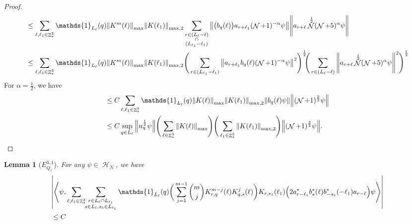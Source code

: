 \documentclass[sn-mathphys, Numbered ,a4paper]{sn-jnl}%
\DeclareMathOperator{\Z}{\mathbb{Z}}
\DeclareMathOperator{\HH}{\mathcal{H}}
\DeclareMathOperator{\NN}{\mathcal{N}}
\newcommand{\half}{\frac{1}{2}}
\newcommand{\eva}[1]{\left\langle #1 \right\rangle}
\theoremstyle{plain}
\newtheorem{lemma}[theorem]{Lemma}
\theoremstyle{definition}
\theoremstyle{remark}
\theoremstyle{plain}
\theoremstyle{definition}
\theoremstyle{remark}
\begin{document}
\begin{proof}
\begin{align}
		&\leq \sum\limits_{\ell,\ell_1 \in \Z^3_*} \mathds{1}_{L_\ell}(q) \norm{K^{m}(\ell)}_{\mathrm{max}}\norm{K(\ell_1)}_{\mathrm{max},2} \sum\limits_{\substack{r \in (L_\ell-\ell) \\ \cap \\ (L_{\ell_1}-\ell_1)}} \norm{\big(b_{q}(\ell)\big) a_{r+\ell_1} (\NN+1)^{-\alpha} \psi} \norm { a_{r+\ell}\NN^\half (\NN+5)^{\alpha} \psi }\nonumber\\
		&\leq \sum\limits_{\ell,\ell_1 \in \Z^3_*} \mathds{1}_{L_\ell}(q) \norm{K^{m}(\ell)}_{\mathrm{max}}\norm{K(\ell_1)}_{\mathrm{max},2} \Bigg(\sum\limits_{r \in (L_{\ell_1}-\ell_1)} \norm{ a_{r+\ell_1}b_{q}(\ell) (\NN+1)^{-\alpha} \psi}^2\Bigg)^\half\!\!\Bigg( \sum\limits_{r \in (L_\ell-\ell)} \norm { a_{r+\ell}\NN^\half (\NN+5)^{\alpha} \psi }^2\Bigg)^\half\nonumber\\
	\end{align}
	For $\alpha = \half$, we have
	\begin{align}
		&\leq C\sum\limits_{\ell,\ell_1 \in \Z^3_*} \mathds{1}_{L_\ell}(q) \norm{K(\ell)}_{\mathrm{max}}\norm{K(\ell_1)}_{\mathrm{max},2}  \norm{b_{q}(\ell) \psi} \norm { (\NN+1)^{\frac{3}{2}} \psi }\nonumber\\
		&\leq C \sup\limits_{q \in L_\ell} \norm{n_{q}^{\half} \psi} \Bigg(\sum\limits_{\ell \in \Z^3_*} \norm{K(\ell)}_{\mathrm{max}}\Bigg)\Bigg( \sum\limits_{\ell_1 \in \Z^3_*}\norm{K(\ell_1)}_{\mathrm{max},2} \Bigg)  \norm { (\NN+1)^{\frac{3}{2}} \psi }. 
	\end{align}
\end{proof}
\begin{lemma}[$E_{Q_1}^{3,1}$]
	For any $\psi \in \HH_N$, we have
	\begin{align}
		&\abs{\eva{\psi, \sum\limits_{\ell, \ell_1\in \Z^3_*}\!\!
				\sum\limits_{\substack{r\in L_{\ell}\cap L_{\ell_1}\\s \in L_{\ell}, s_1\in L_{\ell_1}}}\mathds{1}_{L_\ell}(q) \bigg(\sum_{j=1}^{m-1}{{m}\choose j}K^{m-j}_{r,q}(\ell)K^{j}_{q,s}(\ell)\bigg)K_{r,s_1}(\ell_1)\Big( 2a^*_{r-\ell_1}b^*_{s}(\ell) b^*_{-s_1}(-\ell_1)a_{r-\ell} \Big)  \psi}}\nonumber\\
		&\leq C
	\end{align}
\end{lemma}
\end{document}
